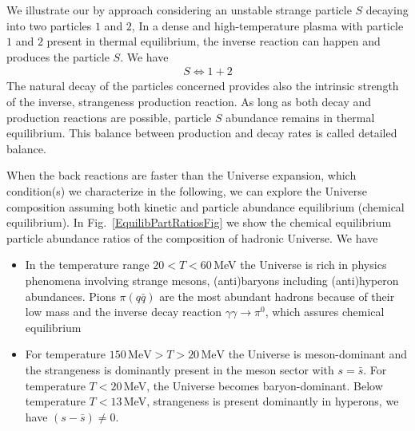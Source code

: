 \documentclass[universe,article,submit,moreauthors,pdftex,a4paper]{Definitions/mdpi}
\begin{document}
We illustrate our by approach considering an unstable strange particle $S$ decaying into two particles $1$ and $2$, 
In a dense and high-temperature plasma with particle $1$ and $2$ present in thermal equilibrium, the inverse reaction can happen and produces the particle $S$. We have
\begin{align}
 S\Longleftrightarrow1+2
\end{align}
The natural decay of the particles concerned provides also the intrinsic strength of the inverse, strangeness production reaction. As long as both decay and production reactions are possible, particle $S$ abundance remains in thermal equilibrium. This balance between production and decay rates is called detailed balance. 

When the back reactions are faster than the Universe expansion, which condition(s) we characterize in the following, we can explore the Universe composition assuming both kinetic and particle abundance equilibrium (chemical equilibrium). In Fig.~\ref{EquilibPartRatiosFig} we show the chemical equilibrium particle abundance ratios of the composition of hadronic Universe. We have
\begin{itemize}
\item
In the temperature range $20 <T <60$\,MeV the Universe is rich in physics phenomena involving strange mesons, (anti)baryons including (anti)hyperon abundances. 
Pions $\pi(q\bar q)$ are the most abundant hadrons because of their low mass and the inverse decay reaction $\gamma\gamma\rightarrow\pi^0$, which assures chemical equilibrium~\cite{Kuznetsova:2008jt} %

\item
For temperature $150\,\mathrm{MeV}>T>20\,\mathrm{MeV}$ the Universe is meson-dominant and the strangeness is dominantly present in the meson sector with $s=\bar s$. For temperature $T<20$\,MeV, the Universe becomes baryon-dominant. Below temperature $T<13$\,MeV, strangeness is present dominantly in hyperons, we have $(s -\bar s)\ne 0$.
\end{itemize}
\end{document}
